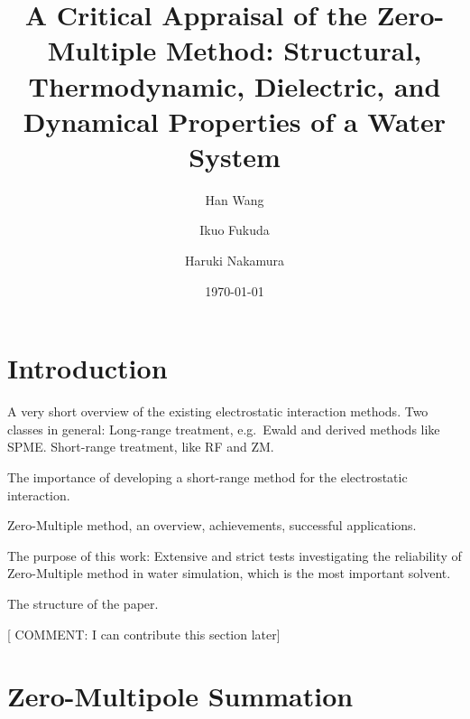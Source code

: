 \documentclass[a4paper,preprint,unsortedaddress,onecolumn,fleqn]{revtex4}
\begin{document}
\title{A Critical Appraisal of the Zero-Multiple Method: Structural,
Thermodynamic, Dielectric, and Dynamical Properties of a Water System}
\author{Han Wang}
\author{Ikuo Fukuda}
\author{Haruki Nakamura}

\date{\today}

\begin{abstract}
\end{abstract}

\maketitle


\section{Introduction}

A very short overview of the existing electrostatic interaction methods. Two
classes in general: Long-range treatment, e.g.~Ewald and derived methods
like SPME. Short-range treatment, like RF and ZM.

The importance of developing a short-range method for the electrostatic
interaction.

Zero-Multiple method, an overview, achievements, successful applications.

The purpose of this work: Extensive and strict tests investigating the
reliability of Zero-Multiple method in water simulation, which is the most
important solvent.

The structure of the paper.

[{\color{blue} COMMENT: I can contribute this section later}]

\section{Zero-Multipole Summation}
\end{document}

